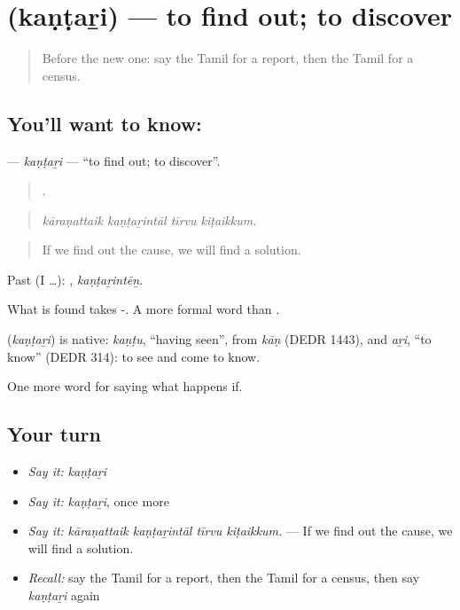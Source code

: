 \section[\texorpdfstring{\ta{கண்டறி} (kaṇṭaṟi)}{கண்டறி (kaṇṭaṟi)}]{ (kaṇṭaṟi) — to find out; to discover}

\label{lesson:TA-C393-kantari}



\begin{quote}
Before the new one: say the Tamil for a report, then the Tamil for a census.
\end{quote}

\subsection*{You'll want to know: }
\textbf{} — \emph{kaṇṭaṟi} — \textquotedblleft{}to find out; to discover\textquotedblright{}.

\begin{quote}
   .
\end{quote}

\begin{quote}
\emph{kāraṇattaik kaṇṭaṟintāl tīrvu kiṭaikkum.}
\end{quote}

\begin{quote}
If we find out the cause, we will find a solution.
\end{quote}

Past (I …): , \emph{kaṇṭaṟintēṉ}.

What is found takes -. A more formal word than .

\begin{cousinweb}
\textbf{} (\emph{kaṇṭaṟi}) is native: \emph{kaṇṭu}, \textquotedblleft{}having seen\textquotedblright{}, from \emph{kāṇ} (DEDR 1443), and \emph{aṟi}, \textquotedblleft{}to know\textquotedblright{} (DEDR 314): to see and come to know.
\end{cousinweb}

\begin{grammarlens}[title={What you've built}]
One more word for saying what happens if.
\end{grammarlens}

\subsection*{Your turn}
\begin{itemize}
\raggedright
  \item \emph{Say it:} \emph{kaṇṭaṟi}
  \item \emph{Say it:} \emph{kaṇṭaṟi}, once more
  \item \emph{Say it:} \emph{kāraṇattaik kaṇṭaṟintāl tīrvu kiṭaikkum.} — If we find out the cause, we will find a solution.
  \item \emph{Recall:} say the Tamil for a report, then the Tamil for a census, then say \emph{kaṇṭaṟi} again
\end{itemize}

